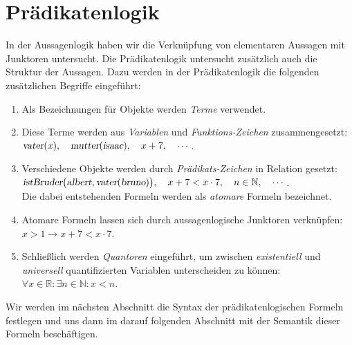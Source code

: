 \chapter{Pr\"{a}dikatenlogik}
In der Aussagenlogik haben wir die Verkn\"{u}pfung von elementaren Aussagen mit Junktoren untersucht.
Die Pr\"{a}dikatenlogik untersucht zus\"{a}tzlich auch die Struktur der Aussagen.  Dazu werden in der Pr\"{a}dikatenlogik 
die folgenden zus\"{a}tzlichen Begriffe eingef\"{u}hrt:
\begin{enumerate}
\item Als Bezeichnungen f\"{u}r Objekte werden {\emph{\color{blue}Terme}} verwendet.
\item Diese Terme werden aus {\emph{\color{blue}Variablen}} und {\emph{\color{blue}Funktions-Zeichen}}
      zusammengesetzt: 
      \\[0.2cm]
      \hspace*{1.3cm}
      $\textsl{vater}(x),\quad \textsl{mutter}(\textsl{isaac}), \quad x+7, \quad \cdots$.
\item Verschiedene Objekte werden durch {\emph{\color{blue}Pr\"{a}dikats-Zeichen}} in Relation gesetzt:
      \\[0.2cm]
      \hspace*{1.3cm}
      $\textsl{istBruder}\bigl(\textsl{albert}, \textsl{vater}(\textsl{bruno})\bigr),\quad x+7 < x\cdot 7,\quad n \in \mathbb{N}, \quad \cdots$.
      \\[0.2cm]
      Die dabei entstehenden Formeln werden als {\emph{\color{blue}atomare}} Formeln bezeichnet.
\item Atomare Formeln lassen sich durch aussagenlogische Junktoren verkn\"{u}pfen:
      \\[0.2cm]
      \hspace*{1.3cm}
      $x > 1 \rightarrow x + 7 < x \cdot  7$.
\item Schlie\ss{}lich werden {\emph{\color{blue}Quantoren}} eingef\"{u}hrt, um zwischen {\emph{\color{blue}existentiell}} und
      {\emph{\color{blue}universell}} quantifizierten Variablen unterscheiden
      zu k\"{o}nnen:
      \\[0.2cm]
      \hspace*{1.3cm}
      $\forall x \in \mathbb{R}: \exists n \in \mathbb{N}: x < n$.
\end{enumerate}
Wir werden im n\"{a}chsten Abschnitt die Syntax der pr\"{a}dikatenlogischen Formeln festlegen und uns dann
im darauf folgenden Abschnitt mit der Semantik dieser Formeln besch\"{a}ftigen.

